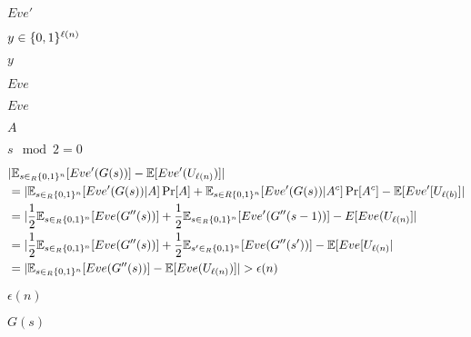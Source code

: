 \documentclass[10pt]{book}
\begin{document}
\begin{mdSnippets}
\begin{mdInlineSnippet}[0c3570ae86ed9d695d5d1d469a0b8bfa]
$Eve'$\end{mdInlineSnippet}%
\begin{mdInlineSnippet}[d0d0ca637f59563d6c7cd09be7cfda19]%
$y \in \{0,1\}^{\ell(n)}$\end{mdInlineSnippet}%
\begin{mdInlineSnippet}[415290769594460e2e485922904f345d]%
$y$\end{mdInlineSnippet}%
\begin{mdInlineSnippet}%
$Eve$\end{mdInlineSnippet}%
\begin{mdInlineSnippet}%
$Eve$\end{mdInlineSnippet}%
\begin{mdInlineSnippet}[7fc56270e7a70fa81a5935b72eacbe29]%
$A$\end{mdInlineSnippet}%
\begin{mdInlineSnippet}[e099c2bfc7c85421c7b3e18c060a7e25]%
$s \mod 2 = 0$\end{mdInlineSnippet}%
\begin{mdDisplaySnippet}%
\[%
\begin{aligned}
&|\E_{s \in_R \zo^{n}}[Eve'(G(s))]  - \E[Eve'(U_{\ell(n)}) ]| \\
&= |\E_{s \in_R \zo^{n}}[Eve'(G(s))| A] \Pr[A] + \E_{s \in R \zo^{n}}[Eve'(G(s)) |A^c] \Pr[A^c] - \E[Eve'[U_{\ell(b)}]| \\
&= |\frac{1}{2}\E_{s \in_R \zo^{n}}[Eve(G''(s))] + \frac{1}{2}\E_{s \in_R \zo^{n}}[Eve'(G''(s-1))] - E[Eve(U_{\ell(n)}]| \\
&= |\frac{1}{2}\E_{s \in_R \zo^{n}}[Eve(G''(s))] + \frac{1}{2}\E_{s' \in_R \zo^{n}}[Eve(G''(s'))] - \E[Eve[U_{\ell(n)}| \\
&= |\E_{s \in_R \zo^{n}}[Eve(G''(s))] -\E[Eve(U_{\ell(n)})]| > \epsilon(n)
\end{aligned}  
\]%
\end{mdDisplaySnippet}%
\begin{mdInlineSnippet}[6d0c1b4d1364086cf8ee344445ebe2b4]%
$\epsilon(n)$\end{mdInlineSnippet}%
\begin{mdInlineSnippet}%
$G(s)$\end{mdInlineSnippet}%

\end{mdSnippets}
\end{document}
